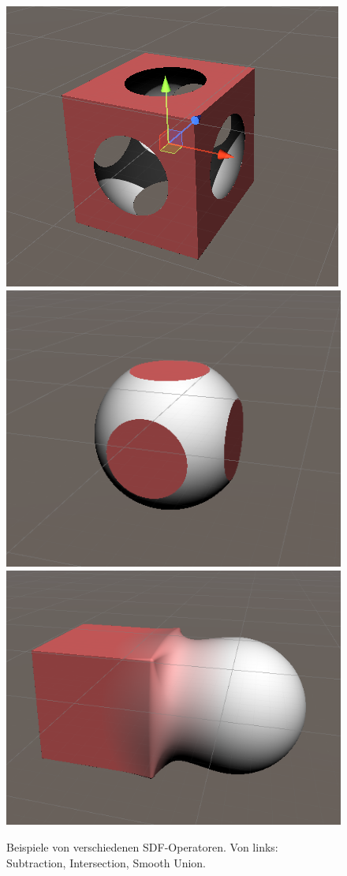 \begin{figure}[h]
	\centering
	\includegraphics[height=0.15\textheight]{Grafiken/Basics/Volume/sdf_cut.png}
	\includegraphics[height=0.15\textheight]{Grafiken/Basics/Volume/sdf_mask.png}
	\includegraphics[height=0.15\textheight]{Grafiken/Basics/Volume/sdf_union.png}
	\begin{footnotesize}
		\caption{Beispiele von verschiedenen SDF-Operatoren.
			Von links: Subtraction, Intersection, Smooth Union.}
		\label{fig:sdfOperators}
	\end{footnotesize}
\end{figure}
